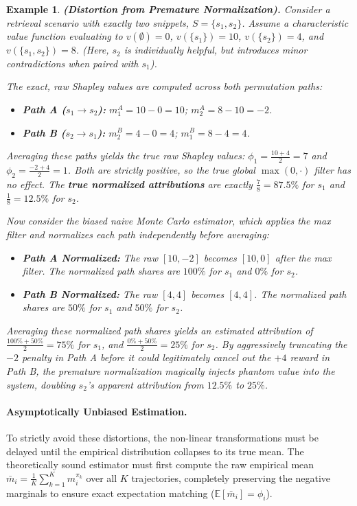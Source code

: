 \documentclass{article}
\newtheorem{example}{Example}
\begin{document}
\begin{example}
\textbf{(Distortion from Premature Normalization).}
Consider a retrieval scenario with exactly two snippets, $S = \{s_1, s_2\}$. Assume a characteristic value function evaluating to $v(\emptyset) = 0$, $v(\{s_1\}) = 10$, $v(\{s_2\}) = 4$, and $v(\{s_1, s_2\}) = 8$. (Here, $s_2$ is individually helpful, but introduces minor contradictions when paired with $s_1$).

The exact, raw Shapley values are computed across both permutation paths:
\begin{itemize}
    \item \textbf{Path A ($s_1 \to s_2$):} $m_1^A = 10 - 0 = 10$; \quad $m_2^A = 8 - 10 = -2$.
    \item \textbf{Path B ($s_2 \to s_1$):} $m_2^B = 4 - 0 = 4$; \quad $m_1^B = 8 - 4 = 4$.
\end{itemize}
Averaging these paths yields the true raw Shapley values: $\phi_1 = \frac{10 + 4}{2} = 7$ and $\phi_2 = \frac{-2 + 4}{2} = 1$. Both are strictly positive, so the true global $\max(0, \cdot)$ filter has no effect. The \textbf{true normalized attributions} are exactly $\frac{7}{8} = 87.5\%$ for $s_1$ and $\frac{1}{8} = 12.5\%$ for $s_2$.

Now consider the biased naive Monte Carlo estimator, which applies the max filter and normalizes \textit{each path independently} before averaging:
\begin{itemize}
    \item \textbf{Path A Normalized:} The raw $[10, -2]$ becomes $[10, 0]$ after the max filter. The normalized path shares are $100\%$ for $s_1$ and $0\%$ for $s_2$.
    \item \textbf{Path B Normalized:} The raw $[4, 4]$ becomes $[4, 4]$. The normalized path shares are $50\%$ for $s_1$ and $50\%$ for $s_2$.
\end{itemize}
Averaging these normalized path shares yields an estimated attribution of $\frac{100\% + 50\%}{2} = 75\%$ for $s_1$, and $\frac{0\% + 50\%}{2} = 25\%$ for $s_2$. By aggressively truncating the $-2$ penalty in Path A before it could legitimately cancel out the $+4$ reward in Path B, the premature normalization magically injects phantom value into the system, doubling $s_2$'s apparent attribution from $12.5\%$ to $25\%$.
\end{example}

\paragraph{Asymptotically Unbiased Estimation.}
To strictly avoid these distortions, the non-linear transformations must be delayed until the empirical distribution collapses to its true mean. The theoretically sound estimator must first compute the raw empirical mean $\bar{m}_i = \frac{1}{K} \sum_{k=1}^K m_i^{\pi_k}$ over all $K$ trajectories, completely preserving the negative marginals to ensure exact expectation matching ($\mathbb{E}[\bar{m}_i] = \phi_i$). 
\end{document}
